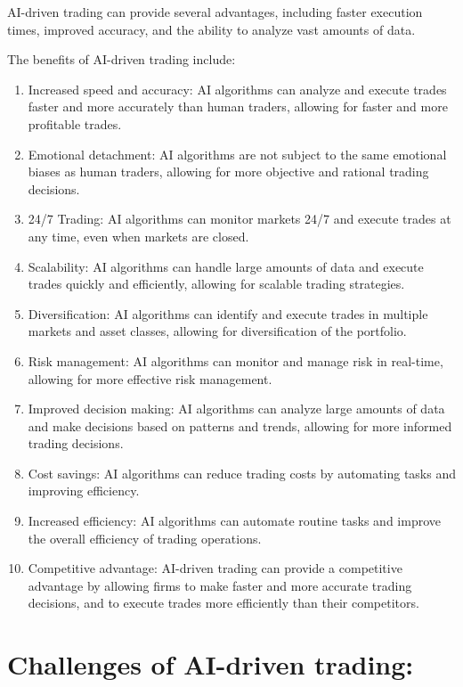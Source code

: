 \documentclass[
  letterpaper,
  DIV=11,
  numbers=noendperiod]{scrreprt}
\begin{document}

AI-driven trading can provide several advantages, including faster
execution times, improved accuracy, and the ability to analyze vast
amounts of data.

The benefits of AI-driven trading include:

\begin{enumerate}
\def\labelenumi{\arabic{enumi}.}
\item
  Increased speed and accuracy: AI algorithms can analyze and execute
  trades faster and more accurately than human traders, allowing for
  faster and more profitable trades.
\item
  Emotional detachment: AI algorithms are not subject to the same
  emotional biases as human traders, allowing for more objective and
  rational trading decisions.
\item
  24/7 Trading: AI algorithms can monitor markets 24/7 and execute
  trades at any time, even when markets are closed.
\item
  Scalability: AI algorithms can handle large amounts of data and
  execute trades quickly and efficiently, allowing for scalable trading
  strategies.
\item
  Diversification: AI algorithms can identify and execute trades in
  multiple markets and asset classes, allowing for diversification of
  the portfolio.
\item
  Risk management: AI algorithms can monitor and manage risk in
  real-time, allowing for more effective risk management.
\item
  Improved decision making: AI algorithms can analyze large amounts of
  data and make decisions based on patterns and trends, allowing for
  more informed trading decisions.
\item
  Cost savings: AI algorithms can reduce trading costs by automating
  tasks and improving efficiency.
\item
  Increased efficiency: AI algorithms can automate routine tasks and
  improve the overall efficiency of trading operations.
\item
  Competitive advantage: AI-driven trading can provide a competitive
  advantage by allowing firms to make faster and more accurate trading
  decisions, and to execute trades more efficiently than their
  competitors.
\end{enumerate}

\section*{Challenges of AI-driven
trading:}\label{challenges-of-ai-driven-trading}
\end{document}
